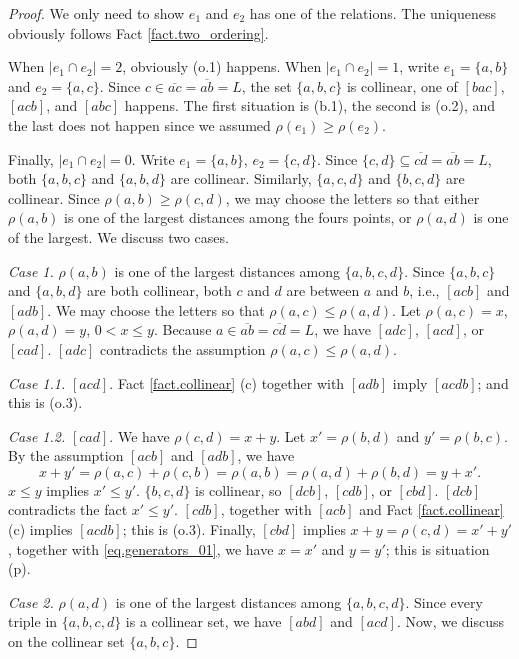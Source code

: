 \documentclass[12pt]{article}
\newcommand{\ov}{\overline}
\begin{document}
\begin{proof}
We only need to show $e_1$ and $e_2$ has one of the relations.
The uniqueness obviously follows Fact \ref{fact.two_ordering}.

When $|e_1\cap e_2| = 2$, obviously (o.1) happens.
When $|e_1 \cap e_2| = 1$,
write $e_1 = \{a, b\}$ and $e_2 = \{a, c\}$. 
Since $c \in \ov{ac} = \ov{ab} = L$,
the set $\{a, b, c\}$ is collinear, one of $[bac]$, $[acb]$, and $[abc]$ happens.
The first situation is (b.1), the second is (o.2), and the last does not happen since we 
assumed $\rho(e_1) \ge \rho(e_2)$. 

Finally, $|e_1\cap e_2| = 0$. Write $e_1 = \{a, b\}$, $e_2 = \{c, d\}$.
Since $\{c, d\} \subseteq \ov{cd} = \ov{ab} = L$,
both $\{a, b, c\}$ and $\{a, b, d\}$ are collinear. 
Similarly, $\{a, c, d\}$ and $\{b, c, d\}$ are collinear.
Since $\rho(a, b) \ge \rho(c, d)$, we may choose the letters so that
either $\rho(a, b)$ is one of the largest distances among the fours points,
or $\rho(a, d)$ is one of  the largest. We discuss two cases.

{\em Case 1.} $\rho(a, b)$ is one of the largest distances among $\{a, b, c, d\}$.
Since $\{a, b, c\}$ and $\{a, b, d\}$ are both collinear,
both $c$ and $d$ are between $a$ and $b$, i.e., $[acb]$ and $[adb]$.
We may choose the letters so that $\rho(a, c) \le \rho(a, d)$.
Let $\rho(a, c)=x$, $\rho(a, d)=y$, $0<x\le y$.
Because $a \in \ov{ab} = \ov{cd} = L$, we have $[adc]$, $[acd]$, or $[cad]$.
$[adc]$ contradicts the assumption $\rho(a, c) \le \rho(a, d)$.

{\em Case 1.1.} $[acd]$. Fact \ref{fact.collinear} (c) together with $[adb]$ imply $[acdb]$;
and this is (o.3).

{\em Case 1.2.} $[cad]$. We have $\rho(c, d) = x+y$.
Let $x' = \rho(b, d)$ and $y' = \rho(b, c)$.
By the assumption $[acb]$ and $[adb]$, we have
\begin{equation}\label{eq.generators_01}
x+y' = \rho(a, c)+\rho(c, b) = \rho(a, b) = \rho(a, d) + \rho(b, d) = y+x'.
\end{equation}
$x \le y$ implies $x' \le y'$. $\{b, c, d\}$ is collinear,
so $[dcb]$, $[cdb]$, or $[cbd]$. $[dcb]$ contradicts the fact $x' \le y'$.
$[cdb]$, together with $[acb]$ and Fact \ref{fact.collinear} (c) implies $[acdb]$;
this is (o.3). Finally, $[cbd]$ implies $x+y = \rho(c, d) = x'+y'$,
together with \eqref{eq.generators_01}, we have $x=x'$ and $y=y'$;
this is situation (p).

{\em Case 2.} $\rho(a, d)$ is one of the largest distances among $\{a, b, c, d\}$.
Since every triple in $\{a, b, c, d\}$ is a collinear set, we have $[abd]$ and $[acd]$.
Now, we discuss on the collinear set $\{a, b, c\}$.


\end{proof}
\end{document}
